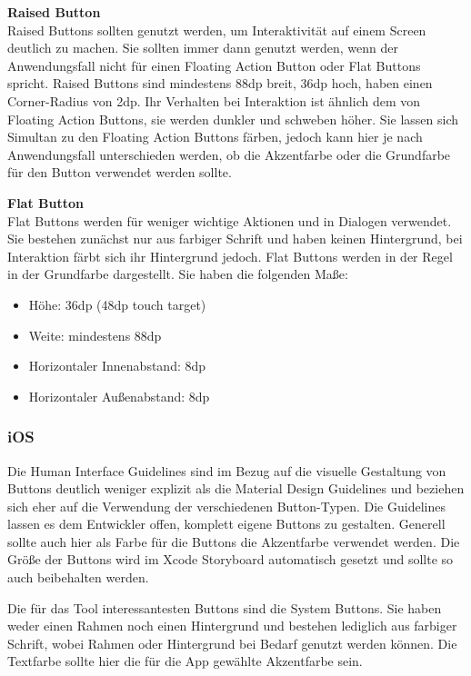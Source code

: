 \textbf{Raised Button} \\
Raised Buttons sollten genutzt werden, um Interaktivität auf einem Screen deutlich zu machen. Sie sollten immer dann genutzt werden, wenn der Anwendungsfall nicht für einen Floating Action Button oder Flat Buttons spricht.
Raised Buttons sind mindestens 88dp breit, 36dp hoch, haben einen Corner-Radius von 2dp. Ihr Verhalten bei Interaktion ist ähnlich dem von Floating Action Buttons, sie werden dunkler und schweben höher.
Sie lassen sich Simultan zu den Floating Action Buttons färben, jedoch kann hier je nach Anwendungsfall unterschieden werden, ob die Akzentfarbe oder die Grundfarbe für den Button verwendet werden sollte.

\textbf{Flat Button} \\
Flat Buttons werden für weniger wichtige Aktionen und in Dialogen verwendet. Sie bestehen zunächst nur aus farbiger Schrift und haben keinen Hintergrund, bei Interaktion färbt sich ihr Hintergrund jedoch. Flat Buttons werden in der Regel in der Grundfarbe dargestellt. Sie haben die folgenden Maße:

\begin{itemize}
	\item Höhe: 36dp (48dp touch target)
	\item Weite: mindestens 88dp
	\item Horizontaler Innenabstand: 8dp
	\item Horizontaler Außenabstand: 8dp
\end{itemize}


\subsubsection{iOS}
Die Human Interface Guidelines sind im Bezug auf die visuelle Gestaltung von Buttons deutlich weniger explizit als die Material Design Guidelines und beziehen sich eher auf die Verwendung der verschiedenen Button-Typen. Die Guidelines lassen es dem Entwickler offen, komplett eigene Buttons zu gestalten.
Generell sollte auch hier als Farbe für die Buttons die Akzentfarbe verwendet werden. Die Größe der Buttons wird im Xcode Storyboard automatisch gesetzt und sollte so auch beibehalten werden.

Die für das Tool interessantesten Buttons sind die System Buttons. Sie haben weder einen Rahmen noch einen Hintergrund und bestehen lediglich aus farbiger Schrift, wobei Rahmen oder Hintergrund bei Bedarf genutzt werden können. Die Textfarbe sollte hier die für die App gewählte Akzentfarbe sein.

